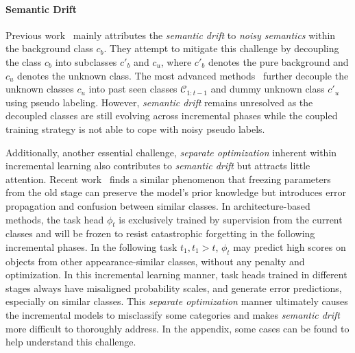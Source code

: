 \paragraph{Semantic Drift}  
Previous work~\citep{ewc_kirkpatrick2017overcoming} mainly attributes the \textit{semantic drift} to \textit{noisy semantics} within the background class $c_b$. They attempt to mitigate this challenge by decoupling the class \( c_b \) into subclasses $c'_b$ and $c_u$, where $c'_b$ denotes the pure background and $c_u$ denotes the unknown class. The most advanced methods~\citep{microseg_zhang2022mining,SSUL_cha2021ssul} further decouple the unknown classes \( c_u \) into past seen classes \( \mathcal{C}_{1:t-1} \) and dummy unknown class \( c'_u \) using pseudo labeling. 
However, \textit{semantic drift} remains unresolved as the decoupled classes are still evolving across incremental phases while the coupled training strategy is not able to cope with noisy pseudo labels.

Additionally, another essential challenge, \textit{separate optimization} inherent within incremental learning also contributes to \textit{semantic drift} but attracts little attention. Recent work~\citep{eclipse_kim2024eclipse} finds a similar phenomenon that freezing parameters from the old stage can preserve the model's prior knowledge but introduces error propagation and confusion between similar classes. 
In architecture-based methods, the task head \( \phi_t \) is exclusively trained by supervision from the current classes and will be frozen to resist catastrophic forgetting in the following incremental phases. In the following task $t_1, t_1 > t$, \( \phi_t \) may predict high scores on objects from other appearance-similar classes, without any penalty and optimization. 
In this incremental learning manner, task heads trained in different stages always have misaligned probability scales, and generate error predictions, especially on similar classes.
This \textit{separate optimization} manner ultimately causes the incremental models to misclassify some categories and makes \textit{semantic drift} more difficult to thoroughly address. In the appendix, some cases can be found to help understand this challenge.

